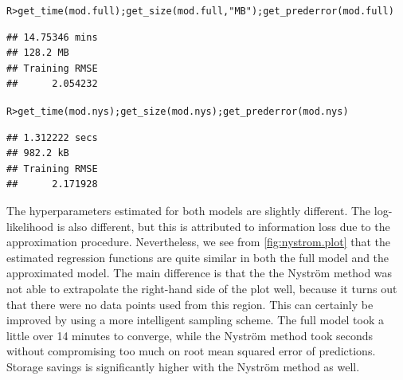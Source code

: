 \documentclass[showframe,11pt,twoside,openright]{report}\usepackage[]{graphicx}\usepackage{xcolor}
\makeatletter
\newcommand{\hlstr}[1]{\textcolor[rgb]{0.063,0.58,0.627}{#1}}%
\newcommand{\hlstd}[1]{\textcolor[rgb]{0.196,0.196,0.196}{#1}}%
\newcommand{\hlkwd}[1]{\textcolor[rgb]{0.78,0.227,0.412}{#1}}%
\newenvironment{kframe}{%
 \def\at@end@of@kframe{}%
 \ifinner\ifhmode%
  \def\at@end@of@kframe{\end{minipage}}%
  \begin{minipage}{\columnwidth}%
 \fi\fi%
 \def\FrameCommand##1{\hskip\@totalleftmargin \hskip-\fboxsep
 \colorbox{shadecolor}{##1}\hskip-\fboxsep
     \hskip-\linewidth \hskip-\@totalleftmargin \hskip\columnwidth}%
 \MakeFramed {\advance\hsize-\width
   \@totalleftmargin\z@ \linewidth\hsize
   \@setminipage}}%
 {\par\unskip\endMakeFramed%
 \at@end@of@kframe}
\newenvironment{knitrout}{}{} %
\makeatother
\begin{document}
\begin{knitrout}
\color{fgcolor}\begin{kframe}
\singlespacing\begin{alltt}
\hlstd{R> }\hlkwd{get_time}\hlstd{(mod.full);} \hlkwd{get_size}\hlstd{(mod.full,} \hlstr{"MB"}\hlstd{);} \hlkwd{get_prederror}\hlstd{(mod.full)}
\end{alltt}
\begin{verbatim}
## 14.75346 mins
## 128.2 MB
## Training RMSE 
##      2.054232
\end{verbatim}
\begin{alltt}
\hlstd{R> }\hlkwd{get_time}\hlstd{(mod.nys);} \hlkwd{get_size}\hlstd{(mod.nys);} \hlkwd{get_prederror}\hlstd{(mod.nys)}
\end{alltt}
\begin{verbatim}
## 1.312222 secs
## 982.2 kB
## Training RMSE 
##      2.171928
\end{verbatim}
\end{kframe}
\end{knitrout}

The hyperparameters estimated for both models are slightly different.
The log-likelihood is also different, but this is attributed to information loss due to the approximation procedure.
Nevertheless, we see from \cref{fig:nystrom.plot} that the estimated regression functions are quite similar in both the full model and the approximated model.
The main difference is that the the Nystr\"om method was not able to extrapolate the right-hand side of the plot well, because it turns out that there were no data points used from this region.
This can certainly be improved by using a more intelligent sampling scheme.
The full model took a little over 14 minutes to converge, while the Nystr\"om method took seconds without compromising too much on root mean squared error of predictions.
Storage savings is significantly higher with the Nystr\"om method as well.
\end{document}

